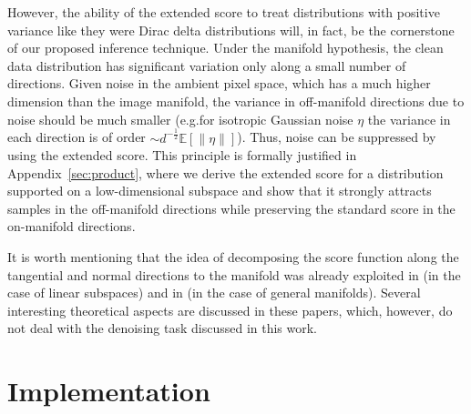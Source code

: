 \documentclass{article}
\newcommand{\E}{\mathbb{E}}
\theoremstyle{plain}
\theoremstyle{definition}
\theoremstyle{remark}
\begin{document}
However, the ability of the extended score to treat distributions with positive variance like they were Dirac delta distributions will, in fact, be the cornerstone of our proposed inference technique. 
Under the manifold hypothesis, the clean  data distribution  has significant variation only along a small number of directions. Given noise in the ambient pixel space, which has a much higher dimension than the image manifold, the variance in off-manifold directions due to noise should be much smaller (e.g.\@ for isotropic Gaussian noise $\eta$ the variance in each direction is of order $\sim\! d^{-\frac{1}{2}} \E[\|\eta\|]$). Thus, noise can be suppressed by using the extended score. This principle is formally justified in Appendix~\ref{sec:product}, where we derive the extended score for a distribution supported on a low-dimensional subspace and show that it strongly attracts samples in the off-manifold directions while preserving the standard score in the on-manifold directions.

It is worth mentioning that the idea of decomposing the score function along the tangential and normal directions to the manifold was already exploited in 
 \cite{pmlr-v202-chen23o} (in the case of linear subspaces) and in \cite{liu2026improving} (in the case of general manifolds). Several interesting theoretical aspects are discussed in these papers, which, however, do not deal with the denoising task discussed in this work.



\section{Implementation}\label{sec:implementation}
\end{document}
